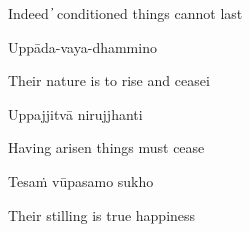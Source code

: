 \begin{english}
  Indeed  ̓  conditioned things cannot last
\end{english}

Uppāda-vaya-dhammino

\begin{english}
  Their nature is to rise and ceasei
\end{english}

Uppajjitvā nirujjhanti

\begin{english}
  Having arisen things must cease
\end{english}

Tesaṁ vūpasamo sukho

\begin{english}
  Their stilling is true happiness
\end{english}

\suttaRef{[Trad]}

\clearpage

